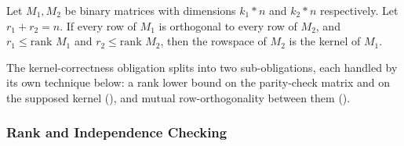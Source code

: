 \begin{lemma}\label{lma41}
    Let $M_1, M_2$ be binary matrices with dimensions $k_1 * n$ and $k_2 * n$
    respectively. Let $r_1 + r_2 = n$. If every row of $M_1$ is orthogonal to
    every row of $M_2$, and $r_1 \le \text{rank } M_1$ and $r_2 \le \text{rank }
    M_2$, then the rowspace of $M_2$ is the kernel of $M_1$.
\end{lemma}

%

The kernel-correctness obligation splits into two sub-obligations, each handled
by its own technique below: a rank lower bound on the parity-check matrix and on
the supposed kernel (), and mutual row-orthogonality
between them ().

\subsubsection{Rank and Independence Checking}
\label{sec:rank-check}

%
%

